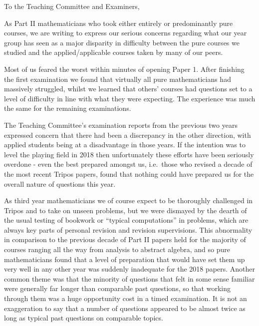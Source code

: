 \documentclass{letter}
\begin{document}
\begin{letter}{}
\opening{To the Teaching Committee and Examiners,}

As Part II mathematicians who took either entirely or predominantly pure courses, we are writing to express our serious concerns regarding what our year group has seen as a major disparity in difficulty between the pure courses we studied and the applied/applicable courses taken by many of our peers.

Most of us feared the worst within minutes of opening Paper 1.
After finishing the first examination we found that virtually all pure mathematicians had massively struggled, whilst we learned that others' courses had questions set to a level of difficulty in line with what they were expecting.
The experience was much the same for the remaining examinations.

The Teaching Committee's examination reports from the previous two years expressed concern that there had been a discrepancy in the other direction, with applied students being at a disadvantage in those years.
If the intention was to level the playing field in 2018 then unfortunately these efforts have been seriously overdone - even the best prepared amongst us, i.e.\ those who revised a decade of the most recent Tripos papers, found that nothing could have prepared us for the overall nature of questions this year.

As third year mathematicians we of course expect to be thoroughly challenged in Tripos and to take on unseen problems, but we were dismayed by the dearth of the usual testing of bookwork or ``typical computations'' in problems, which are always key parts of personal revision and revision supervisions.
This abnormality in comparison to the previous decade of Part II papers held for the majority of courses ranging all the way from analysis to abstract algebra, and so pure mathematicians found that a level of preparation that would have set them up very well in any other year was suddenly inadequate for the 2018 papers.
Another common theme was that the minority of questions that felt in some sense familiar were generally far longer than comparable past questions, so that working through them was a huge opportunity cost in a timed examination.
It is not an exaggeration to say that a number of questions appeared to be almost twice as long as typical past questions on comparable topics.


\end{letter}
\end{document}
